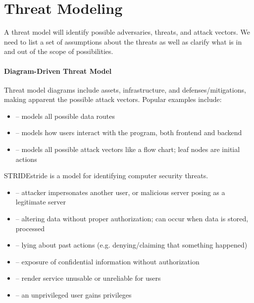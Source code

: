 \documentclass[12pt]{report}
\begin{document}
\section{Threat Modeling}
A threat model will identify possible adversaries, threats, and attack vectors. We need to list a set of assumptions about the threats as well as clarify what is in and out of the scope of possibilities.

\paragraph{Diagram-Driven Threat Model}
Threat model diagrams include assets, infrastructure, and defenses/mitigations, making apparent the possible attack vectors. Popular examples include:
\begin{itemize}[noitemsep]
    \item {} -- models all possible data routes
    \item {} -- models how users interact with the program, both frontend and backend
    \item {} -- models all possible attack vectors like a flow chart; leaf nodes are initial actions
\end{itemize}

\begin{dfnbox}{STRIDE}{stride}
     is a model for identifying computer security threats.
    \begin{itemize}[noitemsep]
        \item {} -- attacker impersonates another user, or malicious server posing as a legitimate server
        \item {} -- altering data without proper authorization; can occur when data is stored, processed
        \item {} -- lying about past actions (e.g. denying/claiming that something happened)
        \item {} -- exposure of confidential information without authorization
        \item {} -- render service unusable or unreliable for users
        \item {} -- an unprivileged user gains privileges
    \end{itemize}
\end{dfnbox}
\end{document}
